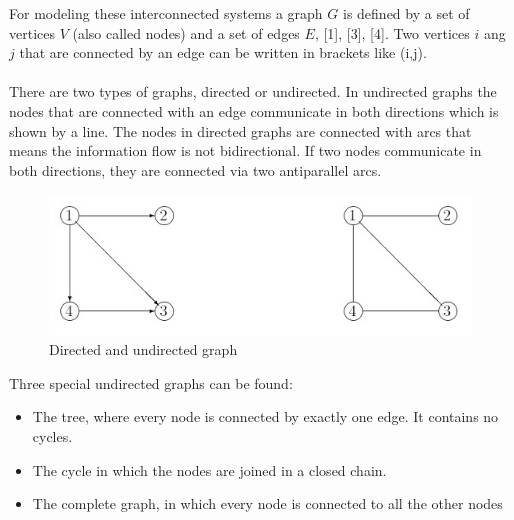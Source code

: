 \documentclass[12pt]{report}
\begin{document}
For modeling these interconnected systems a graph $ G $ is defined by a set of vertices $ V $ (also called nodes) and a set of edges $ E $, [1], [3], [4]. Two vertices $i$ ang $j$ that are connected by an edge can be written in brackets like (i,j).\\
\\
There are two types of graphs, directed or undirected. In undirected graphs the nodes that are connected with an edge communicate in both directions which is shown by a line. The nodes in directed graphs are connected with arcs that means the information flow is not bidirectional. If two nodes communicate in both directions, they are connected via two antiparallel arcs.\\
%	
\begin{figure}[h]
\centering
\includegraphics[scale=.6]{dirgraphs}
\caption{Directed and undirected graph}
\label{FIG:abb1}
\end{figure}
Three special undirected graphs can be found:
\begin{itemize}
	\item The tree, where every node is connected by exactly one edge. It contains no cycles.
	\item The cycle in which the nodes are joined in a closed chain.
	\item The complete graph, in which every node is connected to all the other nodes
\end{itemize}
\end{document}
